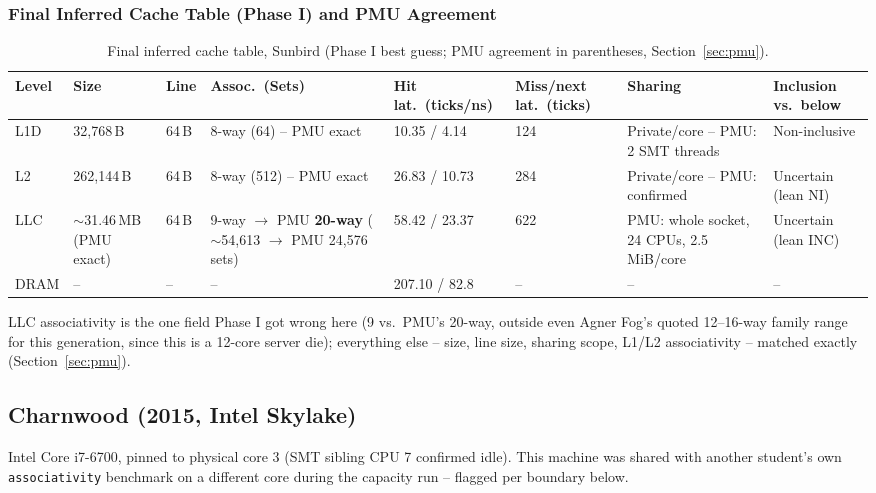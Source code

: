 \documentclass{article}
\begin{document}
\subsubsection{Final Inferred Cache Table (Phase I) and PMU Agreement}
\begin{table}[H]
\centering\scriptsize
\caption{Final inferred cache table, Sunbird (Phase I best guess; PMU agreement in parentheses, Section~\ref{sec:pmu}).}
\begin{tabularx}{\textwidth}{|l|X|X|X|l|l|X|X|}
\hline
Level & Size & Line & Assoc.\ (Sets) & Hit lat.\ (ticks/ns) & Miss/next lat.\ (ticks) & Sharing & Inclusion vs.\ below\\
\hline
L1D & 32,768\,B & 64\,B & 8-way (64) -- PMU exact & 10.35 / 4.14 & 124 & Private/core -- PMU: 2 SMT threads & Non-inclusive\\
L2 & 262,144\,B & 64\,B & 8-way (512) -- PMU exact & 26.83 / 10.73 & 284 & Private/core -- PMU: confirmed & Uncertain (lean NI)\\
LLC & $\sim$31.46\,MB (PMU exact) & 64\,B & 9-way $\to$ PMU \textbf{20-way} ($\sim$54,613 $\to$ PMU 24,576 sets) & 58.42 / 23.37 & 622 & PMU: whole socket, 24 CPUs, 2.5\,MiB/core & Uncertain (lean INC)\\
DRAM & -- & -- & -- & 207.10 / 82.8 & -- & -- & --\\
\hline
\end{tabularx}
\end{table}
LLC associativity is the one field Phase I got wrong here (9 vs.\ PMU's 20-way, outside even
Agner Fog's quoted 12--16-way family range for this generation, since this is a 12-core
server die); everything else -- size, line size, sharing scope, L1/L2 associativity --
matched exactly (Section~\ref{sec:pmu}).

\subsection{Charnwood (2015, Intel Skylake)}
\label{sec:machine-charnwood}

Intel Core i7-6700, pinned to physical core 3 (SMT sibling CPU 7 confirmed idle). This
machine was shared with another student's own \texttt{associativity} benchmark on a
different core during the capacity run -- flagged per boundary below.
\end{document}
